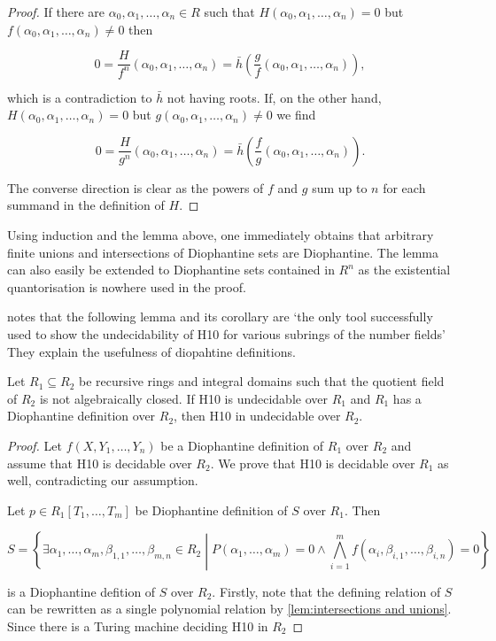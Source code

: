 \begin{proof}
If there are $α_0, α_1, …, α_n ∈ R$ such that
$H(α_0, α_1, …, α_n) = 0$ but $f(α_0, α_1, …, α_n) ≠ 0$ then

\[ 0 = \frac H {f^n} (α_0, α_1, …, α_n) = \bar h \left(\frac gf (α_0, α_1, …, α_n) \right), \]

which is a contradiction to $\bar h$ not having roots. If, on the
other hand, $H(α_0, α_1, …, α_n) = 0$ but $g(α_0, α_1, …, α_n) ≠ 0$
we find

\[ 0 = \frac H {g^n}(α_0, α_1, …, α_n) = \bar h \left( \frac fg (α_0, α_1, …, α_n) \right). \]

The converse direction is clear as the powers of $f$ and $g$ sum up
to $n$ for each summand in the definition of $H$.
\end{proof}

Using induction and the lemma above, one immediately obtains that
arbitrary finite unions and intersections of Diophantine sets are
Diophantine. The lemma can also easily be extended to Diophantine sets
contained in $R^n$ as the existential quantorisation is nowhere used
in the proof.

\textcite{Shlapentokh2000} notes that the following lemma and its corollary are
`the only tool successfully used to show the undecidability of \textsc{H10}
for various subrings of the number fields' They explain the usefulness
of diopahtine definitions.

\begin{lem} \label{lem:moving up}
Let $R_1 \subseteq R_2$ be recursive rings and integral domains such
that the quotient field of $R_2$ is not algebraically closed. If H10
is undecidable over $R_1$ and $R_1$ has a Diophantine definition over
$R_2$, then H10 in undecidable over $R_2$.
\end{lem}

\begin{proof}
Let $f(X, Y_1, …, Y_n)$ be a Diophantine definition of $R_1$ over
$R_2$ and assume that H10 is decidable over $R_2$. We prove that H10
is decidable over $R_1$ as well, contradicting our assumption.

Let $p ∈ R_1[T_1, …, T_m]$ be Diophantine definition of $S$ over
$R_1$. Then

\[ S = \left\lbrace ∃α_1,…,α_m, β_{1,1}, …, β_{m,n} ∈ R_2 \middle| P(α_1, …, α_m) = 0 ∧ \bigwedge_{i=1}^m f(α_i, β_{i,1},…,β_{i,n}) = 0 \right\rbrace\]

is a Diophantine defition of $S$ over $R_2$. Firstly, note that the
defining relation of $S$ can be rewritten as a single polynomial
relation by \cref{lem:intersections and unions}. Since there is
a Turing machine deciding \textsc{H10} in $R_2$
\end{proof}
